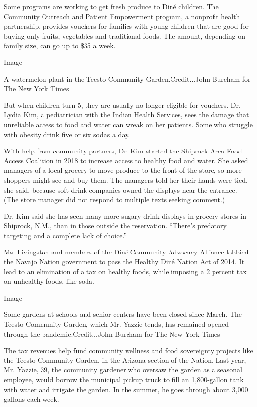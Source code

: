 Some programs are working to get fresh produce to Diné children. The
\href{https://www.copeprogram.org/}{Community Outreach and Patient
Empowerment} program, a nonprofit health partnership, provides vouchers
for families with young children that are good for buying only fruits,
vegetables and traditional foods. The amount, depending on family size,
can go up to \$35 a week.

Image

A watermelon plant in the Teesto Community Garden.Credit...John Burcham
for The New York Times

But when children turn 5, they are usually no longer eligible for
vouchers. Dr. Lydia Kim, a pediatrician with the Indian Health Services,
sees the damage that unreliable access to food and water can wreak on
her patients. Some who struggle with obesity drink five or six sodas a
day.

With help from community partners, Dr. Kim started the Shiprock Area
Food Access Coalition in 2018 to increase access to healthy food and
water. She asked managers of a local grocery to move produce to the
front of the store, so more shoppers might see and buy them. The
managers told her their hands were tied, she said, because soft-drink
companies owned the displays near the entrance. (The store manager did
not respond to multiple texts seeking comment.)

Dr. Kim said she has seen many more sugary-drink displays in grocery
stores in Shiprock, N.M., than in those outside the reservation.
``There's predatory targeting and a complete lack of choice.''

Ms. Livingston and members of the
\href{https://dineadvocacy.org/?fbclid=IwAR17Oomqz5BgHuhAVh693s1hPGHkWJIrRUMzaej_G393ohQe-Y2O5gCvqH0}{Diné
Community Advocacy Alliance} lobbied the Navajo Nation government to
pass the
\href{https://www.tax.navajo-nsn.gov/Navajo\%20Taxes/Regulations/Junk\%20Food\%20Tax\%20Regulations\%20\%201-14-15.pdf}{Healthy
Diné Nation Act of 2014}. It lead to an elimination of a tax on healthy
foods, while imposing a 2 percent tax on unhealthy foods, like soda.

Image

Some gardens at schools and senior centers have been closed since March.
The Teesto Community Garden, which Mr. Yazzie tends, has remained opened
through the pandemic.Credit...John Burcham for The New York Times

The tax revenues help fund community wellness and food sovereignty
projects like the Teesto Community Garden, in the Arizona section of the
Nation. Last year, Mr. Yazzie, 39, the community gardener who oversaw
the garden as a seasonal employee, would borrow the municipal pickup
truck to fill an 1,800-gallon tank with water and irrigate the garden.
In the summer, he goes through about 3,000 gallons each week.

